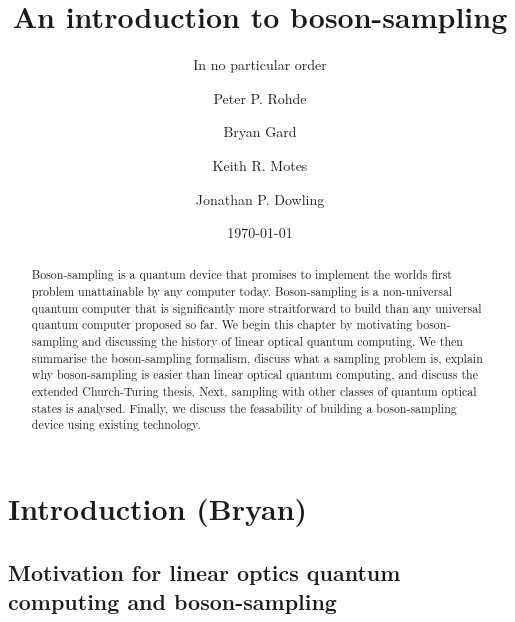 \documentclass[aps,pra,twocolumn,amsmath,amssymb,nofootinbib,superscriptaddress]{revtex4}
\begin{document}


%
% 

\title{An introduction to boson-sampling}

%
%

\author{In no particular order}

\author{Peter P. Rohde}

\author{Bryan Gard}

\author{Keith R. Motes}

\author{Jonathan P. Dowling}

\date{\today}

\frenchspacing

%
%

\begin{abstract}
Boson-sampling is a quantum device that promises to implement the worlds first problem unattainable by any computer today. Boson-sampling is a non-universal quantum computer that is significantly more straitforward to build than any universal quantum computer proposed so far. We begin this chapter by motivating boson-sampling and discussing the history of linear optical quantum computing. We then summarise the boson-sampling formalism, discuss what a sampling problem is, explain why boson-sampling is easier than linear optical quantum computing, and discuss the extended Church-Turing thesis. Next, sampling with other classes of quantum optical states is analysed. Finally, we discuss the feasability of building a boson-sampling device using existing technology. 
\end{abstract}

\maketitle

\section{Introduction (Bryan)}

\subsection{Motivation for linear optics quantum computing and boson-sampling}
\end{document}
